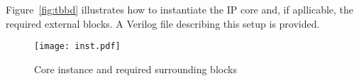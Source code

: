 Figure~\ref{fig:tbbd} illustrates how to instantiate the IP core and, if
apllicable, the required external blocks. A Verilog file describing this setup
is provided.

\begin{figure}[!htbp]
    \centerline{\texttt{[image: inst.pdf]}}
    \vspace{0cm}\caption{Core instance and required surrounding blocks}
    \label{fig:inst}
\end{figure}



